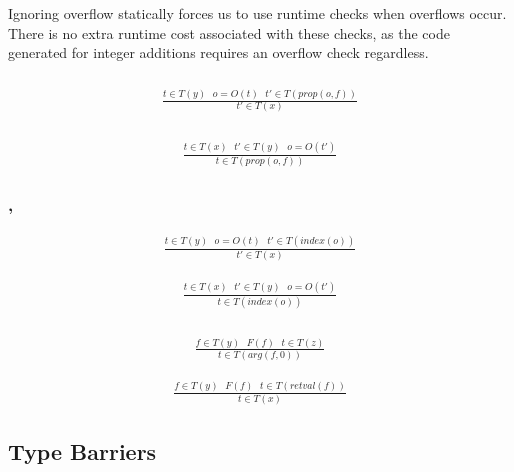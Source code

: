 Ignoring overflow statically forces us to use runtime checks when overflows
occur.
There is no extra runtime cost associated with these checks, as the code
generated for integer additions requires an overflow check regardless.

\subsubsection{}

\begin{eqnarray*}
\frac{t \in T(y) ~~~ o = O(t) ~~~ t' \in T(prop(o,f))}{t' \in T(x)}
\end{eqnarray*}

\subsubsection{}

\begin{eqnarray*}
\frac{t \in T(x) ~~~ t' \in T(y) ~~~ o = O(t')}{t \in T(prop(o,f))}
\end{eqnarray*}

\subsubsection{, }

\begin{eqnarray*}
\frac{t \in T(y) ~~~ o = O(t) ~~~ t' \in T(index(o))}{t' \in T(x)}
\end{eqnarray*}

\begin{eqnarray*}
\frac{t \in T(x) ~~~ t' \in T(y) ~~~ o = O(t')}{t \in T(index(o))}
\end{eqnarray*}

\subsubsection{}

\begin{eqnarray*}
\frac{f \in T(y) ~~~ F(f) ~~~ t \in T(z)}{t \in T(arg(f, 0))}
\end{eqnarray*}

\begin{eqnarray*}
\frac{f \in T(y) ~~~ F(f) ~~~ t \in T(retval(f))}{t \in T(x)}
\end{eqnarray*}

\subsection{Type Barriers}

